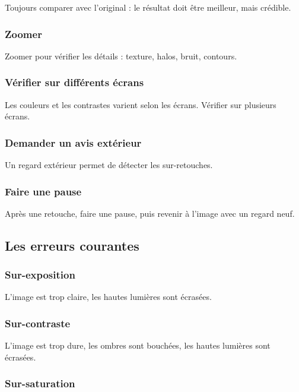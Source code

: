 Toujours comparer avec l'original : le résultat doit être meilleur, mais crédible.

\subsubsection{Zoomer}

Zoomer pour vérifier les détails : texture, halos, bruit, contours.

\subsubsection{Vérifier sur différents écrans}

Les couleurs et les contrastes varient selon les écrans. Vérifier sur plusieurs écrans.

\subsubsection{Demander un avis extérieur}

Un regard extérieur permet de détecter les sur-retouches.

\subsubsection{Faire une pause}

Après une retouche, faire une pause, puis revenir à l'image avec un regard neuf.

\subsection{Les erreurs courantes}

\subsubsection{Sur-exposition}

L'image est trop claire, les hautes lumières sont écrasées.

\subsubsection{Sur-contraste}

L'image est trop dure, les ombres sont bouchées, les hautes lumières sont écrasées.

\subsubsection{Sur-saturation}

